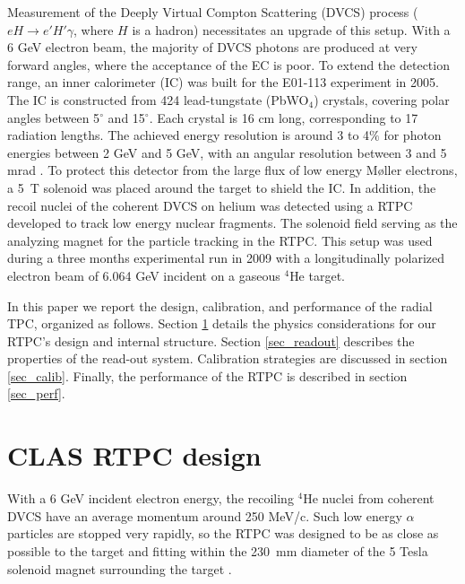 \documentclass[twocolumn,showpacs,superscriptaddress,groupedaddress]{revtex4}
\begin{document}
Measurement of the Deeply Virtual Compton Scattering (DVCS) process
($eH \rightarrow e' H' \gamma$, where $H$ is a hadron) necessitates an upgrade
of this setup.  With a 6 GeV electron beam, the majority of DVCS photons are produced
at very forward angles, where the acceptance of the EC is poor. To extend the detection range,
an inner calorimeter (IC) was built for the E01-113 experiment in 2005.
The IC is constructed from 424 lead-tungstate (PbWO$_{4}$) crystals, covering polar 
angles between 5$^{\circ}$ and 15$^{\circ}$. Each crystal is 16 cm long, corresponding
to 17 radiation lengths. The achieved energy resolution is around 3 to 4$\%$ for photon
energies between 2 GeV and 5 GeV, with an angular resolution between 3 and 5 mrad 
\cite{Hyon-suk}. To protect this detector from the large flux of low energy M{\o}ller 
electrons, a 5~T solenoid was placed around the target to shield the IC. 
In addition, the recoil nuclei of the coherent DVCS on helium was detected 
using a RTPC developed to track low energy nuclear fragments. The solenoid field
serving as the analyzing magnet for the particle tracking in the RTPC. This 
setup was used during a three months experimental run
in 2009 with a longitudinally polarized electron beam of 6.064 GeV incident 
on a gaseous $^{4}$He target.


In this paper we report the design, calibration, and performance of the radial TPC,
organized as follows. Section \ref{sec_design} details the physics considerations for our RTPC's
design and internal structure. Section \ref{sec_readout} describes the properties
of the read-out system. Calibration strategies are discussed in section \ref{sec_calib}.
Finally, the performance of the RTPC is described in section \ref{sec_perf}.


\section{CLAS RTPC design} \label{sec_design}

With a 6 GeV incident electron energy, the recoiling $^{4}$He nuclei from coherent 
DVCS have an average momentum around 250 MeV/c. Such low energy $\alpha$ 
particles are stopped very rapidly, so the RTPC was designed to be as close 
as possible to the target and fitting within the 230~mm diameter 
of the 5 Tesla solenoid magnet surrounding the target \cite{Hyon-suk}. 
\end{document}
